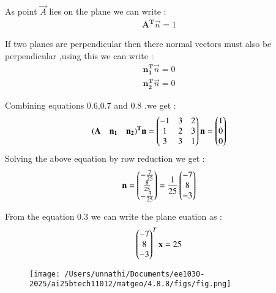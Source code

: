 \documentclass[journal]{IEEEtran}
\begin{document}
As point $\vec{A}$ lies on the plane we can write :
\begin{align}
    \mathbf{A^{T}}\vec{n} = 1
\end{align}

If two planes are perpendicular then there normal vectors must also be perpendicular ,using this we can write :
\begin{align}
    \mathbf{n_1^{T}}\vec{n} = 0\\
    \mathbf{n_2^{T}}\vec{n} = 0
\end{align}

Combining equations 0.6,0.7 and 0.8 ,we get :
\begin{align}
    \mathbf{(A\quad n_1\quad n_2)^{T}}\mathbf{n} = \begin{pmatrix}-1 & 3& 2\\
                                                      1 & 2 & 3\\
                                                      3 & 3& 1\end{pmatrix}\mathbf{n} = \begin{pmatrix}1\\0\\0\end{pmatrix}
\end{align}
Solving the above equation by row reduction we get :
\begin{align}
    \mathbf{n} = \begin{pmatrix}-\frac{7}{25} \\ \frac{8}{25} \\ -\frac{3}{25}\end{pmatrix} = \frac{1}{25}\begin{pmatrix}-7\\8\\-3\end{pmatrix}
\end{align}

From the equation 0.3 we can write the plane euation as :
\begin{align}
    \begin{pmatrix}-7\\8\\-3\end{pmatrix}^{T}\mathbf{x} = 25
\end{align}

\begin{figure}[h!]
   \centering
   \texttt{[image: /Users/unnathi/Documents/ee1030-2025/ai25btech11012/matgeo/4.8.8/figs/fig.png]}
   \caption{}
   \label{stemplot}
\end{figure}
\end{document}
